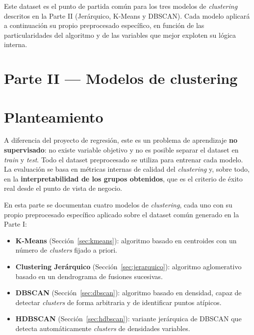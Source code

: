 \documentclass[11pt,a4paper]{article}
\begin{document}
Este dataset es el punto de partida común para los tres modelos de \textit{clustering} descritos en la Parte II (Jerárquico, K-Means y DBSCAN). Cada modelo aplicará a continuación su propio preprocesado específico, en función de las particularidades del algoritmo y de las variables que mejor exploten su lógica interna.

\section*{Parte II — Modelos de clustering}

\section{Planteamiento}

A diferencia del proyecto de regresión, este es un problema de aprendizaje \textbf{no supervisado}: no existe variable objetivo y no es posible separar el dataset en \textit{train} y \textit{test}. Todo el dataset preprocesado se utiliza para entrenar cada modelo. La evaluación se basa en métricas internas de calidad del \textit{clustering} y, sobre todo, en la \textbf{interpretabilidad de los grupos obtenidos}, que es el criterio de éxito real desde el punto de vista de negocio.

En esta parte se documentan cuatro modelos de \textit{clustering}, cada uno con su propio preprocesado específico aplicado sobre el dataset común generado en la Parte I:

\begin{itemize}
    \item \textbf{K-Means} (Sección~\ref{sec:kmeans}): algoritmo basado en centroides con un número de \textit{clusters} fijado a priori.
    \item \textbf{Clustering Jerárquico} (Sección~\ref{sec:jerarquico}): algoritmo aglomerativo basado en un dendrograma de fusiones sucesivas.
    \item \textbf{DBSCAN} (Sección~\ref{sec:dbscan}): algoritmo basado en densidad, capaz de detectar \textit{clusters} de forma arbitraria y de identificar puntos atípicos.
    \item \textbf{HDBSCAN} (Sección~\ref{sec:hdbscan}): variante jerárquica de DBSCAN que detecta automáticamente \textit{clusters} de densidades variables.
\end{itemize}
\end{document}
